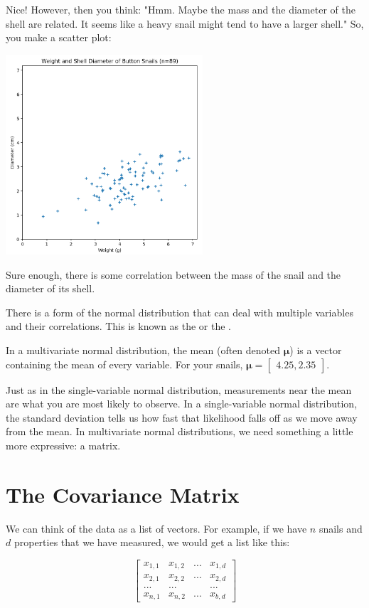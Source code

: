Nice! However, then you think: "Hmm. Maybe the mass and the diameter of the shell are related. It seems like a heavy snail might tend to have a larger shell."  So, you make a scatter plot:

\includegraphics[width=0.55\textwidth]{scatter.png}

Sure enough, there is some correlation between the mass of the snail and the diameter of its shell.

There is a form of the normal distribution that can deal with multiple variables and their correlations.
This is known as the  or the .

In a multivariate normal distribution, the mean (often denoted $\boldsymbol\mu$) is a vector containing the mean of every variable.
For your snails, $\boldsymbol\mu = \begin{bmatrix} 4.25, 2.35 \end{bmatrix}$.

Just as in the single-variable normal distribution, measurements near the mean are what you are most likely to observe.
In a single-variable normal distribution, the standard deviation tells us how fast that likelihood falls off as we move away from the mean.
In multivariate normal distributions, we need something a little more expressive: a matrix.

\section{The Covariance Matrix}

We can think of the data as a list of vectors.
For example, if we have $n$ snails and $d$ properties that we have measured, we would get a list like this:

$$\begin{bmatrix}
x_{1,1} & x_{1,2} & ... & x_{1,d} \\
x_{2,1} & x_{2,2} & ... & x_{2,d} \\
... & ... & &... \\
x_{n,1} & x_{n,2} & ... & x_{b,d}\end{bmatrix}$$

